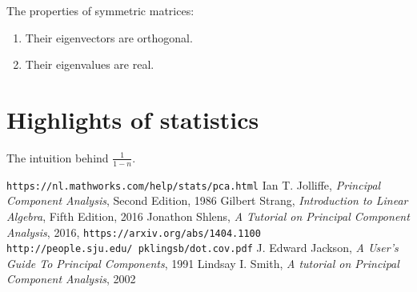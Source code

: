 \documentclass[10pt,twocolumn]{article}
\begin{document}
The properties of symmetric matrices:

\begin{enumerate}
\item Their eigenvectors are orthogonal.
\item Their eigenvalues are real.
\end{enumerate}



\section{Highlights of statistics} \label{app:B}

The intuition behind $\frac{1}{1-n}$.

\thebibliography{}

 \texttt{https://nl.mathworks.com/help/stats/pca.html}
 Ian T. Jolliffe, \textit{Principal Component Analysis}, Second Edition, 1986
 Gilbert Strang, \textit{Introduction to Linear Algebra}, Fifth Edition, 2016
 Jonathon Shlens, \textit{A Tutorial on Principal Component Analysis}, 2016, \texttt{https://arxiv.org/abs/1404.1100}
 \texttt{http://people.sju.edu/~pklingsb/dot.cov.pdf}
 J. Edward Jackson, \textit{A User's Guide To Principal Components}, 1991
 Lindsay I. Smith, \textit{A tutorial on Principal Component Analysis}, 2002
\end{document}

